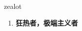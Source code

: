 
\begin{frame}
{\huge zealot}
\begin{center}
\begin{enumerate}\Large
  \item \textbf{狂热者，极端主义者}
\end{enumerate}
\end{center}
\end{frame}
